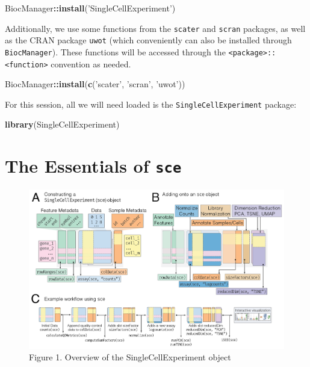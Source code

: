 \documentclass[]{book}
\newenvironment{Shaded}{\begin{snugshade}}{\end{snugshade}}
\newcommand{\KeywordTok}[1]{\textcolor[rgb]{0.13,0.29,0.53}{\textbf{#1}}}
\newcommand{\NormalTok}[1]{#1}
\newcommand{\OperatorTok}[1]{\textcolor[rgb]{0.81,0.36,0.00}{\textbf{#1}}}
\newcommand{\StringTok}[1]{\textcolor[rgb]{0.31,0.60,0.02}{#1}}
\begin{document}
\begin{Shaded}
\begin{Highlighting}[]
\NormalTok{BiocManager}\OperatorTok{::}\KeywordTok{install}\NormalTok{(}\StringTok{'SingleCellExperiment'}\NormalTok{)}
\end{Highlighting}
\end{Shaded}

Additionally, we use some functions from the \texttt{scater} and \texttt{scran} packages, as well as the CRAN package \texttt{uwot} (which conveniently can also be installed through \texttt{BiocManager}). These functions will be accessed through the \texttt{\textless{}package\textgreater{}::\textless{}function\textgreater{}} convention as needed.

\begin{Shaded}
\begin{Highlighting}[]
\NormalTok{BiocManager}\OperatorTok{::}\KeywordTok{install}\NormalTok{(}\KeywordTok{c}\NormalTok{(}\StringTok{'scater'}\NormalTok{, }\StringTok{'scran'}\NormalTok{, }\StringTok{'uwot'}\NormalTok{))}
\end{Highlighting}
\end{Shaded}

For this session, all we will need loaded is the \texttt{SingleCellExperiment} package:

\begin{Shaded}
\begin{Highlighting}[]
\KeywordTok{library}\NormalTok{(SingleCellExperiment)}
\end{Highlighting}
\end{Shaded}

\hypertarget{the-essentials-of-sce}{%
\section{\texorpdfstring{The Essentials of \texttt{sce}}{The Essentials of sce}}\label{the-essentials-of-sce}}

\begin{figure}
\centering
\includegraphics{images/singlecellexperiment.png}
\caption{Figure 1. Overview of the SingleCellExperiment object}
\end{figure}
\end{document}

